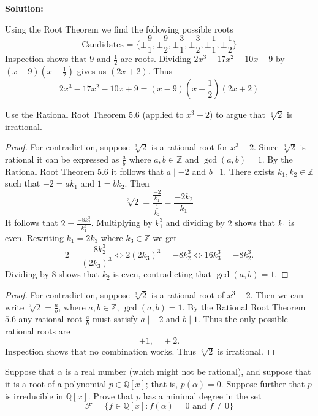 \textbf{Solution:}

Using the Root Theorem we find the following possible roots
\[\text{Candidates = } \{\pm \frac{9}{1},\pm \frac{9}{2},\pm \frac{3}{1},\pm \frac{3}{2},\pm \frac{1}{1},\pm \frac{1}{2}\}\]
Inspection shows that $9$ and $\frac{1}{2}$ are roots.
Dividing $2x^3 - 17x^2 - 10x + 9$ by $(x - 9)(x - \frac{1}{2})$ gives us $(2x + 2)$. Thus 
\[2x^3 - 17x^2 - 10x + 9 = (x - 9)(x - \frac{1}{2})(2x + 2)\]

\begin{tcolorbox}[title=Problem 9, breakable]
    Use the Rational Root Theorem $5.6$ (applied to $x^3 - 2$)
    to argue that $\sqrt[3]{2}$ is irrational.
\end{tcolorbox}

\begin{proof}
    For contradiction, suppose $\sqrt[3]{2}$ is a rational root 
        for $x^3 - 2$.
    Since $\sqrt[3]{2}$ is rational it can be expressed as $\frac{a}{b}$
        where $a, b \in \mathbb{Z}$ and $\gcd(a, b) = 1$.
    By the Rational Root Theorem $5.6$
        it follows that $a \mid -2$ and $b \mid 1$.
    There exists $k_1, k_2 \in \mathbb{Z}$ such that 
        $-2 = a k_1$ and $1 = b k_2$.
    Then 
    \[\sqrt[3]{2} = \frac{\frac{-2}{k_1}}{\frac{1}{k_2}} = \frac{-2 k_2}{k_1}\]
    It follows that $2 = \frac{-8 k_2^3}{k_1^3}$. Multiplying by $k_1^3$
    and dividing by $2$ shows that $k_1$ is even.
    Rewriting $k_1 = 2 k_3$ where $k_3 \in \mathbb{Z}$  
        we get 
        \[2 = \frac{-8 k_2^3}{(2k_3)^3} 
            \iff 2 (2 k_3)^3 = -8 k_2^3
            \iff 16 k_3^3 = -8 k_2^3.\]
    Dividing by $8$ shows that $k_2$ is even, contradicting 
        that $\gcd(a, b) = 1$.
\end{proof}

\begin{proof}
    For contradiction, suppose $\sqrt[3]{2}$ is a rational root 
    of $x^3 - 2$. Then we can write $\sqrt[3]{2} = \frac{a}{b}$, 
    where $a, b \in \mathbb{Z}$, $\gcd(a, b) = 1$.  
    By the Rational Root Theorem $5.6$ any rational root $\frac{a}{b}$ 
        must satisfy $a \mid -2$ and $b \mid 1$.  
    Thus the only possible rational roots are 
    \[
        \pm 1, \quad \pm 2.
    \]  
    Inspection shows that no combination works.
    Thus  $\sqrt[3]{2}$ is irrational.
\end{proof}

\begin{tcolorbox}[title=Problem 10, breakable]
    Suppose that $\alpha$ is a real number (which might 
    not be rational), and suppose that it is a root of a 
    polynomial $p \in \mathbb{Q}[x]$; that is,
    $p(\alpha) = 0$. Suppose further that $p$ is irreducible
    in $\mathbb{Q}[x]$. Prove that $p$ has a minimal degree in the 
    set 
    \[\mathcal{F} = \{f \in \mathbb{Q}[x] : f(\alpha) = 0 \text{ and } f \ne 0\}\]
\end{tcolorbox}

